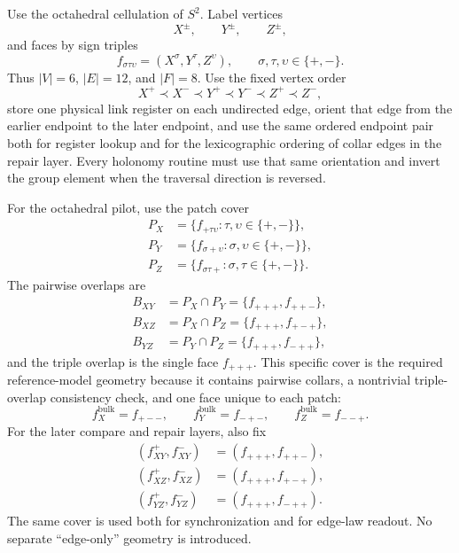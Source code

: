 \documentclass[11pt]{article}
\begin{document}
Use the octahedral cellulation of $S^2$. Label vertices
\begin{equation}
X^{\pm},\qquad Y^{\pm},\qquad Z^{\pm},
\end{equation}
and faces by sign triples
\begin{equation}
f_{\sigma\tau\upsilon}=(X^{\sigma},Y^{\tau},Z^{\upsilon}),
\qquad \sigma,\tau,\upsilon\in\{+,-\}.
\end{equation}
Thus $|V|=6$, $|E|=12$, and $|F|=8$. Use the fixed vertex order
\begin{equation}
X^+ \prec X^- \prec Y^+ \prec Y^- \prec Z^+ \prec Z^-,
\end{equation}
store one physical link register on each undirected edge, orient that edge from the earlier
endpoint to the later endpoint, and use the same ordered endpoint pair both for register lookup
and for the lexicographic ordering of collar edges in the repair layer. Every holonomy routine
must use that same orientation and invert the group element when the traversal direction is
reversed.

For the octahedral pilot, use the patch cover
\begin{align}
P_X &= \{f_{+\tau\upsilon}:\tau,\upsilon\in\{+,-\}\},\\
P_Y &= \{f_{\sigma+\upsilon}:\sigma,\upsilon\in\{+,-\}\},\\
P_Z &= \{f_{\sigma\tau+}:\sigma,\tau\in\{+,-\}\}.
\end{align}
The pairwise overlaps are
\begin{align}
B_{XY}&=P_X\cap P_Y=\{f_{+++},f_{++-}\},\\
B_{XZ}&=P_X\cap P_Z=\{f_{+++},f_{+-+}\},\\
B_{YZ}&=P_Y\cap P_Z=\{f_{+++},f_{-++}\},
\end{align}
and the triple overlap is the single face $f_{+++}$. This specific cover is the required reference-model
geometry because it contains pairwise collars, a nontrivial triple-overlap consistency
check, and one face unique to each patch:
\begin{equation}
f_X^{\mathrm{bulk}}=f_{+--},
\qquad
f_Y^{\mathrm{bulk}}=f_{-+-},
\qquad
f_Z^{\mathrm{bulk}}=f_{--+}.
\end{equation}
For the later compare and repair layers, also fix
\begin{align}
(f_{XY}^{+},f_{XY}^{-})&=(f_{+++},f_{++-}),\\
(f_{XZ}^{+},f_{XZ}^{-})&=(f_{+++},f_{+-+}),\\
(f_{YZ}^{+},f_{YZ}^{-})&=(f_{+++},f_{-++}).
\end{align}
The same cover is used both for synchronization and for edge-law readout. No separate
``edge-only'' geometry is introduced.
\end{document}
